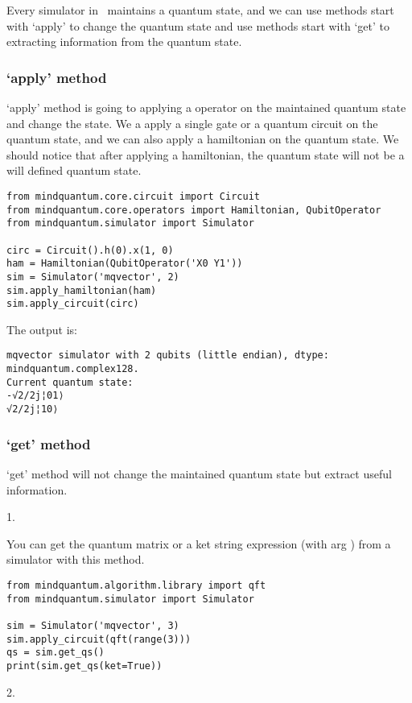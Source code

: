 Every simulator in \MindQuantum\ maintains a quantum state, and we can use methods start with `apply' to change the quantum state and use methods start with `get' to extracting information from the quantum state.

\subsubsection{`apply' method}

`apply' method is going to applying a operator on the maintained quantum state and change the state. We a apply a single gate or a quantum circuit on the quantum state, and we can also apply a hamiltonian on the quantum state. We should notice that after applying a hamiltonian, the quantum state will not be a will defined quantum state.

\begin{lstlisting}
from mindquantum.core.circuit import Circuit
from mindquantum.core.operators import Hamiltonian, QubitOperator
from mindquantum.simulator import Simulator

circ = Circuit().h(0).x(1, 0)
ham = Hamiltonian(QubitOperator('X0 Y1'))
sim = Simulator('mqvector', 2)
sim.apply_hamiltonian(ham)
sim.apply_circuit(circ)
\end{lstlisting}
The output is:
\begin{lstlisting}
mqvector simulator with 2 qubits (little endian), dtype: mindquantum.complex128.
Current quantum state:
-√2/2j¦01⟩
√2/2j¦10⟩
\end{lstlisting}

\subsubsection{`get' method}

`get' method will not change the maintained quantum state but extract useful information.

1. \getqs

You can get the quantum matrix or a ket string expression (with arg ) from a simulator with this method.
\begin{lstlisting}
from mindquantum.algorithm.library import qft
from mindquantum.simulator import Simulator

sim = Simulator('mqvector', 3)
sim.apply_circuit(qft(range(3)))
qs = sim.get_qs()
print(sim.get_qs(ket=True))
\end{lstlisting}

2. \getexpectation

